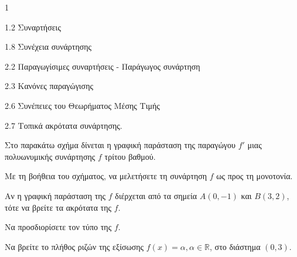 \begin{ylh}{1}
    \item 1.2 Συναρτήσεις
    \item 1.8 Συνέχεια συνάρτησης
    \item 2.2 Παραγωγίσιμες συναρτήσεις - Παράγωγος συνάρτηση
    \item 2.3 Κανόνες παραγώγισης
    \item 2.6 Συνέπειες του Θεωρήματος Μέσης Τιμής
    \item 2.7 Τοπικά ακρότατα συνάρτησης.
\end{ylh}
\begin{figure}
    \centering
\end{figure}
Στο παρακάτω σχήμα δίνεται η γραφική παράσταση της παραγώγου $f'$ μιας πολυωνυμικής συνάρτησης $f$ τρίτου βαθμού.
\begin{alist}
    \item Με τη βοήθεια του σχήματος, να μελετήσετε τη συνάρτηση $f$ ως προς τη μονοτονία. 
    \item Αν η γραφική παράσταση της $f$ διέρχεται από τα σημεία $A(0,-1)$ και $B(3,2)$, τότε να βρείτε τα ακρότατα της $f$. 
    \item Να προσδιορίσετε τον τύπο της $f$. 
    \item Να βρείτε το πλήθος ριζών της εξίσωσης $f(x) = \alpha, \alpha \in \mathbb{R}$, στο διάστημα $(0,3)$. 
\end{alist}